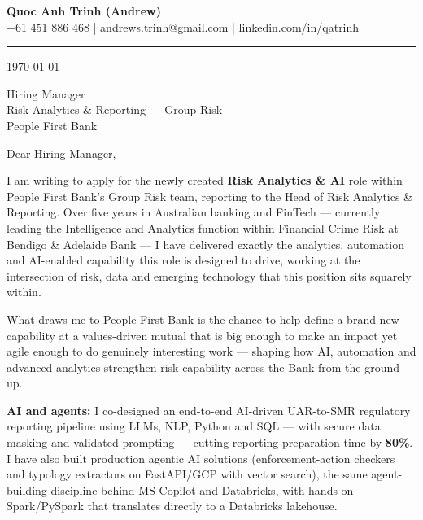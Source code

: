 \documentclass[11pt, a4paper]{letter}
\begin{document}
\begin{center}
    {\LARGE \textbf{Quoc Anh Trinh (Andrew)}}\\[4pt]
    {\small
        +61 451 886 468 \quad|\quad
        \href{mailto:andrews.trinh@gmail.com}{andrews.trinh@gmail.com} \quad|\quad
        \href{https://www.linkedin.com/in/qatrinh}{linkedin.com/in/qatrinh}
    }
\end{center}

\vspace{6pt}
\hrule
\vspace{10pt}

\today

\vspace{8pt}

Hiring Manager\\
Risk Analytics \& Reporting --- Group Risk\\
People First Bank

\vspace{6pt}

Dear Hiring Manager,

I am writing to apply for the newly created \textbf{Risk Analytics \& AI} role within People First Bank's Group Risk team, reporting to the Head of Risk Analytics \& Reporting. Over five years in Australian banking and FinTech --- currently leading the Intelligence and Analytics function within Financial Crime Risk at Bendigo \& Adelaide Bank --- I have delivered exactly the analytics, automation and AI-enabled capability this role is designed to drive, working at the intersection of risk, data and emerging technology that this position sits squarely within.

What draws me to People First Bank is the chance to help define a brand-new capability at a values-driven mutual that is big enough to make an impact yet agile enough to do genuinely interesting work --- shaping how AI, automation and advanced analytics strengthen risk capability across the Bank from the ground up.

\textbf{AI and agents:}
I co-designed an end-to-end AI-driven UAR-to-SMR regulatory reporting pipeline using LLMs, NLP, Python and SQL --- with secure data masking and validated prompting --- cutting reporting preparation time by \textbf{80\%}. I have also built production agentic AI solutions (enforcement-action checkers and typology extractors on FastAPI/GCP with vector search), the same agent-building discipline behind MS Copilot and Databricks, with hands-on Spark/PySpark that translates directly to a Databricks lakehouse.
\end{document}
